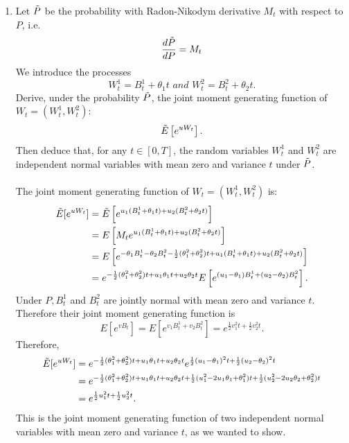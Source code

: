 \documentclass[11pt,a4,table]{article}
\begin{document}
\begin{enumerate}
\begin{enumerate}
        \item Let $\Tilde{P}$ be the probability with Radon-Nikodym derivative $M_t$ with respect to $P$, i.e.
        \begin{equation*}
            \frac{d\Tilde{P}}{dP} = M_t
        \end{equation*}
        We introduce the processes
        \begin{equation*}
            W_t^1 = B_t^1 + \theta_1 t \textit{ and } W_t^2 = B_t^2 + \theta_2 t.
        \end{equation*}
        Derive, under the probability $\Tilde{P}$, the joint moment generating function of $W_t=(W_t^1, W_t^2)$:
        \begin{equation*}
            \Tilde{E}\left[e^{uW_t}\right].
        \end{equation*}
        Then deduce that, for any $t\in[0,T]$, the random variables $W_t^1$ and $W_t^2$ are independent normal variables with mean zero and variance $t$ under $\Tilde{P}$.\\\\
        The joint moment generating function of $W_t=(W_t^1,W_t^2)$ is:
        \begin{align*}
            \Tilde{E}[e^{uW_t}] &= \Tilde{E}\left[e^{u_1(B_t^1+\theta_1t) + u_2(B_t^2 + \theta_2t)}\right]\\
            &= E\left[M_t e^{u_1(B_t^1 + \theta_1t) + u_2(B_t^2 +\theta_2t)}\right]\\
            &= E\left[e^{-\theta_1B_t^1 - \theta_2B_t^2 - \frac{1}{2}(\theta_1^2 + \theta_2^2)t + u_1(B_t^1 + \theta_1t) + u_2(B_t^2 +\theta_2t)}\right]\\
            &= e^{-\frac{1}{2}(\theta_1^2 + \theta_2^2)t + u_1\theta_1t + u_2\theta_2t}E\left[e^{(u_1 - \theta_1)B_t^1 + (u_2 -\theta_2)B_t^2}\right].
        \end{align*}
        Under $P, B_t^1$ and $B_t^2$ are jointly normal with mean zero and variance $t$. Therefore their joint moment generating function is
        \begin{equation*}
            E[e^{vB_t}]=E\left[e^{v_1B_t^1 + v_2B_t^2}\right] = e^{\frac{1}{2}v_1^2t + \frac{1}{2}v_2^2t}.
        \end{equation*}
        Therefore,
        \begin{align*}
            \Tilde{E}[e^{uW_t}] &= e^{-\frac{1}{2}(\theta_1^2 +\theta_2^2)t + u_1\theta_1t + u_2\theta_2t}e^{\frac{1}{2}(u_1-\theta_1)^2t + \frac{1}{2}(u_2 - \theta_2)^2t}\\
            &= e^{-\frac{1}{2}(\theta_1^2 +\theta_2^2)t + u_1\theta_1t + u_2\theta_2t + \frac{1}{2}(u_1^2-2u_1\theta_1+\theta_1^2)t + \frac{1}{2}(u_2^2 - 2u_2\theta_2 + \theta_2^2)t}\\
            &= e^{\frac{1}{2}u_1^2t + \frac{1}{2}u_2^2t}.
        \end{align*}
        This is the joint moment generating function of two independent normal variables with mean zero and variance $t$, as we wanted to show.
        

\end{enumerate}
\end{enumerate}
\end{document}
